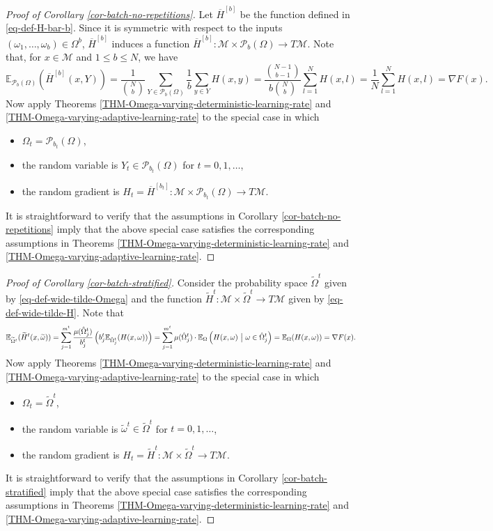 \documentclass{amsart}
\newcommand{\E}{\mathbb{E}}
\newcommand{\bn}[2]{\genfrac{(}{)}{0pt}{}{#1}{#2}}
\newcommand{\M}{\mathcal{M}}
\newcommand{\p}{\mathcal{P}}
\theoremstyle{plain}
\theoremstyle{definition}
\theoremstyle{remark}
\numberwithin{theorem}{section}
\numberwithin{equation}{section}
\begin{document}
\begin{proof}[Proof of Corollary \ref{cor-batch-no-repetitions}]
Let $\overline{H}^{[b]}$ be the function defined in \eqref{eq-def-H-bar-b}. Since it is symmetric with respect to the inputs $(\omega_1,\dots,\omega_b) \in \Omega^b$,  $\overline{H}^{[b]}$ induces a function $\overline{H}^{[b]}: \M \times \p_b(\Omega) \rightarrow T\M$. Note that, for $x \in \M$ and $1 \leq b \leq N$, we have
\[
\E_{\p_b(\Omega)}(\overline{H}^{[b]}(x,Y))=\frac{1}{\bn{N}{b}} \sum_{Y \in \p_b(\Omega)} \frac{1}{b} \sum_{y\in Y} H(x,y) = \frac{\bn{N-1}{b-1}}{b\bn{N}{b}} \sum_{l=1}^N H(x,l) = \frac{1}{N} \sum_{l=1}^N H(x,l) = \nabla F(x).
\]
Now apply Theorems \ref{THM-Omega-varying-deterministic-learning-rate} and \ref{THM-Omega-varying-adaptive-learning-rate} to the special case in which
\begin{itemize}
	\item $\Omega_t = \p_{b_t}(\Omega)$,
	\item the random variable is $Y_t \in  \p_{b_t}(\Omega)$ for $t=0,1,\dots$,
	\item the random gradient is $H_t = \overline{H}^{[b_t]}: \M \times \p_{b_t}(\Omega) \rightarrow T\M$.
\end{itemize}
It is straightforward to verify that the assumptions in Corollary \ref{cor-batch-no-repetitions} imply that the above special case satisfies the corresponding assumptions in Theorems \ref{THM-Omega-varying-deterministic-learning-rate} and \ref{THM-Omega-varying-adaptive-learning-rate}.
\end{proof}

\begin{proof}[Proof of Corollary \ref{cor-batch-stratified}]
Consider the probability space $\widetilde{\Omega}^t$ given by \eqref{eq-def-wide-tilde-Omega} and the function $\widetilde{H}^t: \M \times \widetilde{\Omega}^t \rightarrow T\M$ given by \eqref{eq-def-wide-tilde-H}. Note that 
\[
\E_{\widetilde{\Omega}^t} (\widetilde{H}^t(x,\widetilde{\omega})) = \sum_{j=1}^{m^t} \frac{\mu(\hat{\Omega}_j^t)}{b_j^t} \left(b_j^t \E_{\hat{\Omega}_j^t} (H(x,\omega)) \right) = \sum_{j=1}^{m^t} \mu(\hat{\Omega}_j^t) \cdot \E_{\Omega} \left(H(x,\omega)~\big{|}~\omega \in\hat{\Omega}_j^t\right)= \E_{\Omega} (H(x,\omega)) = \nabla F(x).
\]
Now apply Theorems \ref{THM-Omega-varying-deterministic-learning-rate} and \ref{THM-Omega-varying-adaptive-learning-rate} to the special case in which
\begin{itemize}
	\item $\Omega_t = \widetilde{\Omega}^t$,
	\item the random variable is $\widetilde{\omega}^t \in \widetilde{\Omega}^t$ for $t=0,1,\dots$,
	\item the random gradient is $H_t = \widetilde{H}^t: \M \times \widetilde{\Omega}^t \rightarrow T\M$.
\end{itemize}
It is straightforward to verify that the assumptions in Corollary \ref{cor-batch-stratified} imply that the above special case satisfies the corresponding assumptions in Theorems \ref{THM-Omega-varying-deterministic-learning-rate} and \ref{THM-Omega-varying-adaptive-learning-rate}.
\end{proof}
\end{document}
